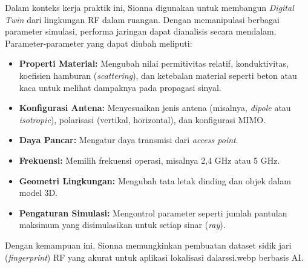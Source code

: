 Dalam konteks kerja praktik ini, Sionna digunakan untuk membangun \textit{Digital Twin} dari lingkungan RF dalam ruangan. Dengan memanipulasi berbagai parameter simulasi, performa jaringan dapat dianalisis secara mendalam. Parameter-parameter yang dapat diubah meliputi:
\begin{itemize}
    \item \textbf{Properti Material:} Mengubah nilai permitivitas relatif, konduktivitas, koefisien hamburan (\textit{scattering}), dan ketebalan material seperti beton atau kaca untuk melihat dampaknya pada propagasi sinyal.
    \item \textbf{Konfigurasi Antena:} Menyesuaikan jenis antena (misalnya, \textit{dipole} atau \textit{isotropic}), polarisasi (vertikal, horizontal), dan konfigurasi MIMO.
    \item \textbf{Daya Pancar:} Mengatur daya transmisi dari \textit{access point}.
    \item \textbf{Frekuensi:} Memilih frekuensi operasi, misalnya 2,4 GHz atau 5 GHz.
    \item \textbf{Geometri Lingkungan:} Mengubah tata letak dinding dan objek dalam model 3D.
    \item \textbf{Pengaturan Simulasi:} Mengontrol parameter seperti jumlah pantulan maksimum yang disimulasikan untuk setiap sinar (\textit{ray}).
\end{itemize}
Dengan kemampuan ini, Sionna memungkinkan pembuatan dataset sidik jari (\textit{fingerprint}) RF yang akurat untuk aplikasi lokalisasi dalarssi.webp berbasis AI.